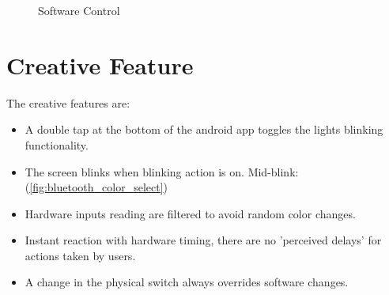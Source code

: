 \documentclass{article}
\begin{document}
	\begin{figure}[h!]
		\centering
		\hfill
		\hfill
		\hfill
		\hfill
		\caption{Software Control}
		\label{fig:software_control}
	\end{figure}
	
	\clearpage
	\section{Creative Feature}
	
	
	The creative features are:
	\begin{itemize}
		\item A double tap at the bottom of the android app toggles the lights blinking functionality. 
		\item The screen blinks when blinking action is on. Mid-blink:(\ref{fig:bluetooth_color_select})
		\item Hardware inputs reading are filtered to avoid random color changes.
		\item Instant reaction with hardware timing, there are no 'perceived delays' for actions taken by users.
		\item A change in the physical switch always overrides software changes.
	\end{itemize}
\end{document}
